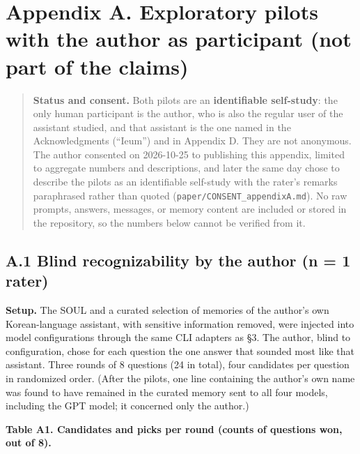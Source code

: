 \documentclass[10pt]{article}
\begin{document}
\section{Appendix A. Exploratory pilots with the author as participant (not part of the claims)}\label{appendix-a.-exploratory-pilots-with-the-author-as-participant-not-part-of-the-claims}

\begin{quote}
\textbf{Status and consent.} Both pilots are an \textbf{identifiable self-study}: the only human participant is the author, who is also the regular user of the assistant studied, and that assistant is the one named in the Acknowledgments (``Ieum'') and in Appendix D. They are not anonymous. The author consented on 2026-10-25 to publishing this appendix, limited to aggregate numbers and descriptions, and later the same day chose to describe the pilots as an identifiable self-study with the rater's remarks paraphrased rather than quoted (\texttt{paper/\allowbreak{}CONSENT\_\allowbreak{}appendixA.\allowbreak{}md}). No raw prompts, answers, messages, or memory content are included or stored in the repository, so the numbers below cannot be verified from it.
\end{quote}

\subsection{A.1 Blind recognizability by the author (n = 1 rater)}\label{a.1-blind-recognizability-by-the-author-n-1-rater}

\textbf{Setup.} The SOUL and a curated selection of memories of the author's own Korean-language assistant, with sensitive information removed, were injected into model configurations through the same CLI adapters as §3. The author, blind to configuration, chose for each question the one answer that sounded most like that assistant. Three rounds of 8 questions (24 in total), four candidates per question in randomized order. (After the pilots, one line containing the author's own name was found to have remained in the curated memory sent to all four models, including the GPT model; it concerned only the author.)

\textbf{Table A1. Candidates and picks per round (counts of questions won, out of 8).}
\end{document}
